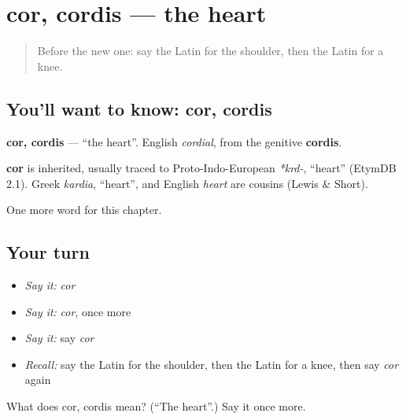 \section[cor, cordis]{cor, cordis — the heart}

\label{lesson:LA-C64-cor}



\begin{quote}
Before the new one: say the Latin for the shoulder, then the Latin for a knee.
\end{quote}

\subsection*{You'll want to know: cor, cordis}
\textbf{cor, cordis} — \textquotedblleft{}the heart\textquotedblright{}. English \emph{cordial}, from the genitive \textbf{cordis}.

\begin{cousinweb}
\textbf{cor} is inherited, usually traced to Proto-Indo-European \emph{*krd-}, \textquotedblleft{}heart\textquotedblright{} (EtymDB 2.1). Greek \emph{kardia}, \textquotedblleft{}heart\textquotedblright{}, and English \emph{heart} are cousins (Lewis \& Short).
\end{cousinweb}

\begin{grammarlens}[title={What you've built}]
One more word for this chapter.
\end{grammarlens}

\subsection*{Your turn}
\begin{itemize}
\raggedright
  \item \emph{Say it:} \emph{cor}
  \item \emph{Say it:} \emph{cor}, once more
  \item \emph{Say it:} say \emph{cor}
  \item \emph{Recall:} say the Latin for the shoulder, then the Latin for a knee, then say \emph{cor} again
\end{itemize}

\begin{tcolorbox}[breakable,colback=teal!4,colframe=teal!35!black,title={Before you move on}]
What does cor, cordis mean? (\textquotedblleft{}The heart\textquotedblright{}.) Say it once more.
\end{tcolorbox}
